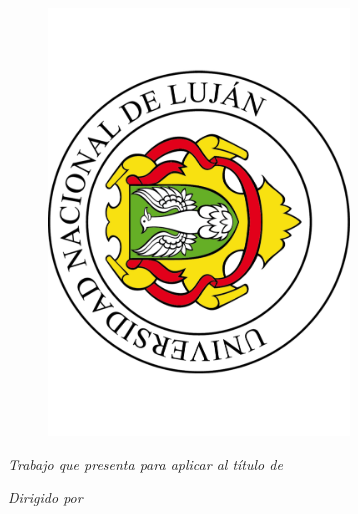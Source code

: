 \begin{titlepage}

\begin{center}

\begin{huge}
\textbf{\tituloTrabajo}
\end{huge}

\vspace*{3cm}

\begin{figure}[htb]
  \begin{center}
    \includegraphics[width=8cm,angle=-90]{recursos/imagenes/logo-unlu}
  \end{center}
\end{figure}

\vspace*{2cm}

\begin{large}
\textit{Trabajo que presenta para aplicar al título de \\ \tituloCarrera}
\end{large}

\vspace*{.5cm}

\begin{large}
\textbf{\autor}
\end{large}

\vspace*{.5cm}

\begin{large}
\textit{Dirigido por}
\end{large}

\vspace*{.5cm}

\begin{large}
\textbf{\director}
\end{large}
\end{center}

\end{titlepage}

\newpage
\thispagestyle{empty}
